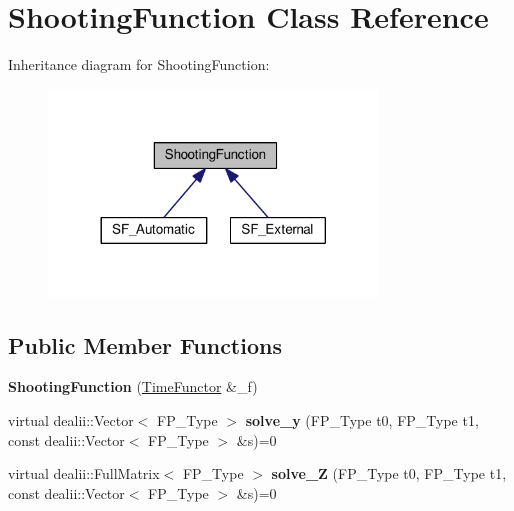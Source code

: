 \hypertarget{classShootingFunction}{}\section{Shooting\+Function Class Reference}
\label{classShootingFunction}


Inheritance diagram for Shooting\+Function\+:
\nopagebreak
\begin{figure}[H]
\begin{center}
\leavevmode
\includegraphics[width=248pt]{classShootingFunction__inherit__graph}
\end{center}
\end{figure}
\subsection*{Public Member Functions}
\begin{DoxyCompactItemize}
\item 
\mbox{\label{classShootingFunction_a9621110f76332ab774b15b7574a43c16}} 
{\bfseries Shooting\+Function} (\hyperlink{classTimeFunctor}{Time\+Functor} \&\+\_\+f)
\item 
\mbox{\label{classShootingFunction_a2fff86465b3e0ee1e4e29d8691dbd8f5}} 
virtual dealii\+::\+Vector$<$ F\+P\+\_\+\+Type $>$ {\bfseries solve\+\_\+y} (F\+P\+\_\+\+Type t0, F\+P\+\_\+\+Type t1, const dealii\+::\+Vector$<$ F\+P\+\_\+\+Type $>$ \&s)=0
\item 
\mbox{\label{classShootingFunction_a679b8e1483215ced4212dd7acb0001f8}} 
virtual dealii\+::\+Full\+Matrix$<$ F\+P\+\_\+\+Type $>$ {\bfseries solve\+\_\+Z} (F\+P\+\_\+\+Type t0, F\+P\+\_\+\+Type t1, const dealii\+::\+Vector$<$ F\+P\+\_\+\+Type $>$ \&s)=0
\end{DoxyCompactItemize}
